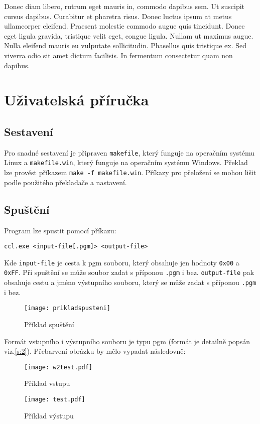 \documentclass[12pt, a4paper]{article}
\begin{document}
Donec diam libero, rutrum eget mauris in, commodo dapibus sem. Ut suscipit cursus dapibus. Curabitur et pharetra risus. Donec luctus ipsum at metus ullamcorper eleifend. Praesent molestie commodo augue quis tincidunt. Donec eget ligula gravida, tristique velit eget, congue ligula. Nullam ut maximus augue. Nulla eleifend mauris eu vulputate sollicitudin. Phasellus quis tristique ex. Sed viverra odio sit amet dictum facilisis. In fermentum consectetur quam non dapibus.


\section{Uživatelská příručka}

\subsection{Sestavení}
Pro snadné sestavení je připraven \texttt{makefile}, který funguje na operačním systému Linux a \texttt{makefile.win}, který funguje na operačním systému Windows. Překlad lze provést příkazem  \texttt{make -f makefile.win}. Příkazy pro přeložení se mohou lišit podle použitého překladače a nastavení.

\subsection{Spuštění}
Program lze spustit pomocí příkazu:

\vspace{0.5cm}
\centerline{ \texttt{ccl.exe <input-file[.pgm]> <output-file>}}
\vspace{0.5cm}

\noindent Kde \texttt{input-file} je cesta k pgm souboru, který obsahuje jen hodnoty \texttt{0x00} a \texttt{0xFF}. Při spuštění se může soubor zadat s příponou \texttt{.pgm} i bez. \texttt{output-file} pak obsahuje cestu a jméno výstupního souboru, který se může zadat s příponou \texttt{.pgm} i bez. 
\begin{figure}[h]
\centering 
\texttt{[image: prikladspusteni]}
\caption{Příklad spuštění}
\end{figure}

Formát vstupního i výstupního souboru je typu pgm (formát je detailně popsán viz.\ref{s:2}). Přebarvení obrázku by mělo vypadat následovně:
\begin{figure}[h]
  \centering
  \begin{minipage}[b]{0.45\textwidth}
    \texttt{[image: w2test.pdf]}
    \caption{Příklad vstupu}
  \end{minipage}
  \hfill
  \begin{minipage}[b]{0.45\textwidth}
    \texttt{[image: test.pdf]}
    \caption{Příklad výstupu}
  \end{minipage}
\end{figure}
\end{document}
